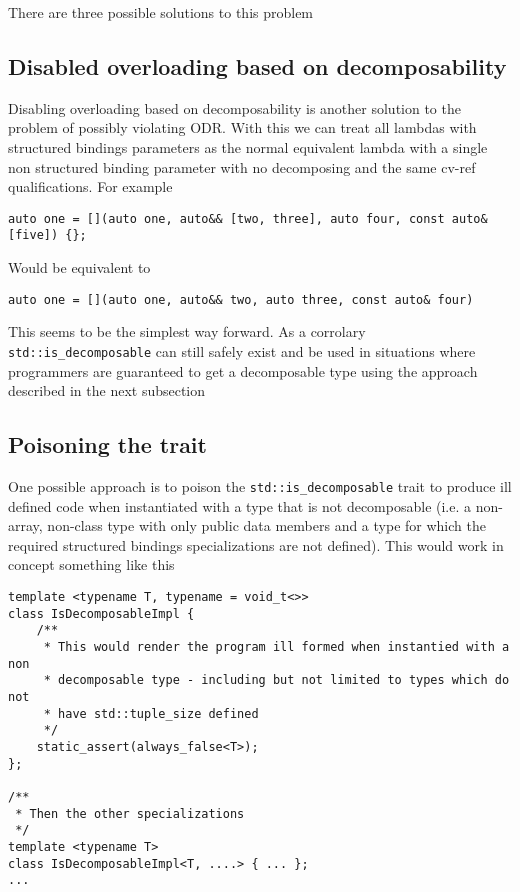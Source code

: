 \documentclass{article}
\begin{document}
There are three possible solutions to this problem

\subsection{Disabled overloading based on decomposability}
Disabling overloading based on decomposability is another solution to the
problem of possibly violating ODR.  With this we can treat all lambdas with
structured bindings parameters as the normal equivalent lambda with a single
non structured binding parameter with no decomposing and the same cv-ref
qualifications.  For example

\begin{lstlisting}
auto one = [](auto one, auto&& [two, three], auto four, const auto& [five]) {};
\end{lstlisting}

Would be equivalent to

\begin{lstlisting}
auto one = [](auto one, auto&& two, auto three, const auto& four)
\end{lstlisting}

This seems to be the simplest way forward.  As a corrolary
\texttt{std::is\_decomposable} can still safely exist and be used in
situations where programmers are guaranteed to get a decomposable type using
the approach described in the next subsection

\subsection{Poisoning the trait}
One possible approach is to poison the \texttt{std::is\_decomposable} trait to
produce ill defined code when instantiated with a type that is not
decomposable (i.e. a non-array, non-class type with only public data members
and a type for which the required structured bindings specializations are not
defined).  This would work in concept something like this

\begin{lstlisting}
template <typename T, typename = void_t<>>
class IsDecomposableImpl {
    /**
     * This would render the program ill formed when instantied with a non
     * decomposable type - including but not limited to types which do not
     * have std::tuple_size defined
     */
    static_assert(always_false<T>);
};

/**
 * Then the other specializations
 */
template <typename T>
class IsDecomposableImpl<T, ....> { ... };
...
\end{lstlisting}
\end{document}
